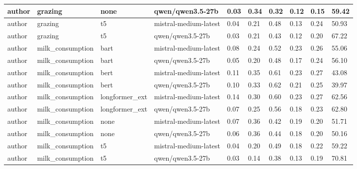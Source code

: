 \begin{tabular}{|l|l|l|l|l|l|l|l|l|l|}
 \hline
 author & grazing & none & qwen/qwen3.5-27b & 0.03 & 0.34 & 0.32 & 0.12 & 0.15 & 59.42 \\
 \hline
 author & grazing & t5 & mistral-medium-latest & 0.04 & 0.21 & 0.48 & 0.13 & 0.24 & 50.93 \\
 \hline
 author & grazing & t5 & qwen/qwen3.5-27b & 0.03 & 0.21 & 0.43 & 0.12 & 0.20 & 67.22 \\
 \hline
 author & milk\_consumption & bart & mistral-medium-latest & 0.08 & 0.24 & 0.52 & 0.23 & 0.26 & 55.06 \\
 \hline
 author & milk\_consumption & bart & qwen/qwen3.5-27b & 0.05 & 0.20 & 0.48 & 0.17 & 0.24 & 56.10 \\
 \hline
 author & milk\_consumption & bert & mistral-medium-latest & 0.11 & 0.35 & 0.61 & 0.23 & 0.27 & 43.08 \\
 \hline
 author & milk\_consumption & bert & qwen/qwen3.5-27b & 0.10 & 0.33 & 0.62 & 0.21 & 0.25 & 39.97 \\
 \hline
 author & milk\_consumption & longformer\_ext & mistral-medium-latest & 0.14 & 0.30 & 0.60 & 0.23 & 0.27 & 62.56 \\
 \hline
 author & milk\_consumption & longformer\_ext & qwen/qwen3.5-27b & 0.07 & 0.25 & 0.56 & 0.18 & 0.23 & 62.80 \\
 \hline
 author & milk\_consumption & none & mistral-medium-latest & 0.07 & 0.36 & 0.42 & 0.19 & 0.20 & 51.71 \\
 \hline
 author & milk\_consumption & none & qwen/qwen3.5-27b & 0.06 & 0.36 & 0.44 & 0.18 & 0.20 & 50.16 \\
 \hline
 author & milk\_consumption & t5 & mistral-medium-latest & 0.04 & 0.20 & 0.49 & 0.18 & 0.22 & 59.22 \\
 \hline
 author & milk\_consumption & t5 & qwen/qwen3.5-27b & 0.03 & 0.14 & 0.38 & 0.13 & 0.19 & 70.81 \\
\hline
\end{tabular}
